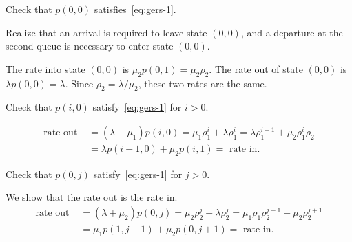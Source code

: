 \documentclass[queueing-book.tex]{subfiles}
\begin{document}
\begin{exercise}\label{ex:72}
Check that $p(0,0)$ satisfies~\cref{eq:gers-1}.
\begin{hint}
  Realize that an arrival is required to leave state $(0,0)$, and a departure at the second queue is necessary to enter state $(0,0)$.
\end{hint}
\begin{solution}
  The rate into state $(0,0)$ is $\mu_2 p(0,1) = \mu_2 \rho_2$. The rate out of state $(0,0)$ is $\lambda p(0,0) = \lambda$. Since $\rho_2=\lambda/\mu_2$, these two rates are the same.
\end{solution}
\end{exercise}

\begin{exercise}
Check that $p(i,0)$ satisfy~\cref{eq:gers-1} for $i> 0$.
\begin{solution}
  \begin{align*}
    \text{rate out } &=(\lambda + \mu_1) p(i,0) = \mu_1 \rho_1^i + \lambda \rho_1^i = \lambda \rho_1^{i-1} + \mu_2 \rho_1^i \rho_2 \\
    &= \lambda p(i-1,0) + \mu_2 p(i, 1) = \text{ rate in}.
  \end{align*}
\end{solution}
\end{exercise}

\begin{exercise}\label{ex:75}
Check that $p(0,j)$ satisfy~\cref{eq:gers-1} for $j> 0$.
\begin{solution} We show that the rate out is the rate in.
  \begin{align*}
    \text{rate out } &=(\lambda + \mu_2) p(0, j) = \mu_2 \rho_2^j + \lambda \rho_2^j
                     = \mu_1\rho_1 \rho_2^{j-1} + \mu_2 \rho_2^{j+1} \\
    &= \mu_1 p(1,j-1) + \mu_2 p(0, j+1) = \text{ rate in}.
  \end{align*}
\end{solution}
\end{exercise}


\end{document}
